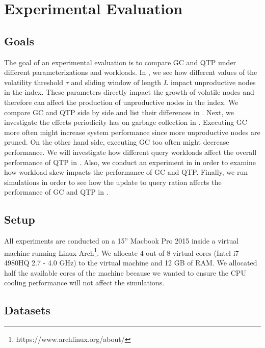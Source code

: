 \documentclass[abstracton,12pt]{scrartcl}
\theoremstyle{definition}
\begin{document}
\newpage

\section{Experimental Evaluation}
\label{sec:experimental-evaluation}

\subsection{Goals}

The goal of an experimental evaluation is to compare GC and QTP under
different parameterizations and workloads.
In , we see how different values of the
volatility threshold $\tau$
and sliding window of length $L$ impact unproductive nodes in the index. These
parameters directly impact the growth of volatile nodes and therefore can affect
the production of unproductive nodes in the index. We compare GC and QTP side by
side and list their differences in . Next, we
investigate the effects periodicity has on garbage collection in .
Executing GC more often might increase system
performance since more unproductive nodes are pruned. On the other hand side,
executing GC too often might decrease performance. We will investigate how
different query workloads affect the overall
performance of QTP in . Also, we conduct an
experiment in  in order to examine how
workload skew impacts the performance of GC and QTP. Finally, we run simulations
in order to see how the update to query ration affects the performance of GC and
QTP in .

\subsection{Setup}

All experiments are conducted on a 15'' Macbook Pro 2015 inside
a virtual machine running Linux Arch\footnote{https://www.archlinux.org/about/}.
We allocate 4 out of 8 virtual cores (Intel i7-4980HQ 2.7 - 4.0 GHz) to the virtual
machine and 12 GB of RAM. We allocated half the available cores of the machine
because we wanted to ensure the CPU cooling performance will not affect the simulations.



\subsection{Datasets}
\end{document}
